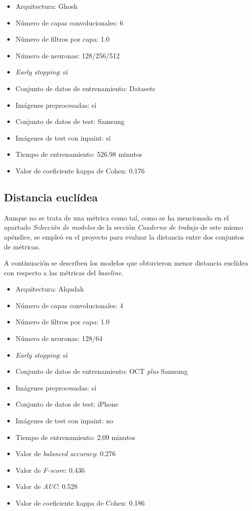 \begin{itemize}
    \item Arquitectura: Ghosh
    \item Número de capas convolucionales: 6
    \item Número de filtros por capa: 1.0
    \item Número de neuronas: 128/256/512
    \item \textit{Early stopping}: sí
    \item Conjunto de datos de entrenamiento: Datasets
    \item Imágenes preprocesadas: sí
    \item Conjunto de datos de test: Samsung
    \item Imágenes de test con inpaint: sí
    \item Tiempo de entrenamiento: 526.98 minutos
    \item Valor de coeficiente kappa de Cohen: 0.176
\end{itemize}

\subsection{Distancia euclídea}

Aunque no se trata de una métrica como tal, como se ha mencionado en el apartado \textit{Selección de modelos} de la sección \textit{Cuaderno de trabajo} de este mismo apéndice, se empleó en el proyecto para evaluar la distancia entre dos conjuntos de métricas.

A continuación se describen los modelos que obtuvieron menor distancia euclídea con respecto a las métricas del \textit{baseline}.

\begin{itemize}
    \item Arquitectura: Alqudah
    \item Número de capas convolucionales: 4
    \item Número de filtros por capa: 1.0
    \item Número de neuronas: 128/64
    \item \textit{Early stopping}: sí
    \item Conjunto de datos de entrenamiento: OCT \textit{plus} Samsung
    \item Imágenes preprocesadas: sí
    \item Conjunto de datos de test: iPhone
    \item Imágenes de test con inpaint: no
    \item Tiempo de entrenamiento: 2.09 minutos
    \item Valor de \textit{balanced accuracy}: 0.276
    \item Valor de \textit{F-score}: 0.436
    \item Valor de \textit{AUC}: 0.528
    \item Valor de coeficiente kappa de Cohen: 0.186
\end{itemize}

